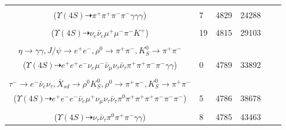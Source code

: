 \documentclass[landscape]{article}
\newcounter{rownumbers}
\newcommand\rn{\stepcounter{rownumbers}\arabic{rownumbers}}
\newcommand{\EOLP}{\\ \hline} %
\newcommand{\topoTags}[1]{#1} %
\begin{document}
\begin{longtable}{clcccc}
\rn & \makecell[l]{ $ 
\Upsilon(4S) \rightarrow B^{0} \bar{B}^{0} ,
B^{0} \rightarrow X_{sd} \gamma ,
\bar{B}^{0} \rightarrow \gamma \gamma ,
X_{sd} \rightarrow \rho^{0} K_{S}^{0} ,
\rho^{0} \rightarrow \pi^{+} \pi^{-} ,
K_{S}^{0} \rightarrow \pi^{+} \pi^{-} 
$ \\ ($
\Upsilon(4S) \dashrightarrow \pi^{+} \pi^{+} \pi^{-} \pi^{-} \gamma \gamma \gamma 
$) } & \topoTags{7 & }4829 & 24288 \EOLP

\rn & \makecell[l]{ $ 
\Upsilon(4S) \rightarrow B^{0} \bar{B}^{0} ,
B^{0} \rightarrow \nu_{e} \bar{\nu}_{e} K^{*} ,
\bar{B}^{0} \rightarrow \mu^{+} \mu^{-} ,
K^{*} \rightarrow \pi^{-} K^{+} 
$ \\ ($
\Upsilon(4S) \dashrightarrow \nu_{e} \bar{\nu}_{e} \mu^{+} \mu^{-} \pi^{-} K^{+} 
$) } & \topoTags{19 & }4815 & 29103 \EOLP

\rn & \makecell[l]{ $ 
\Upsilon(4S) \rightarrow B^{0} \bar{B}^{0} ,
B^{0} \rightarrow \tau^{+} \tau^{-} X_{sd} ,
\bar{B}^{0} \rightarrow \eta J/\psi ,
\tau^{+} \rightarrow e^{+} \nu_{e} \bar{\nu}_{\tau} ,
\tau^{-} \rightarrow \mu^{-} \bar{\nu}_{\mu} \nu_{\tau} ,
X_{sd} \rightarrow \rho^{0} K_{S}^{0} ,
$ \\ $
\eta \rightarrow \gamma \gamma ,
J/\psi \rightarrow e^{+} e^{-} ,
\rho^{0} \rightarrow \pi^{+} \pi^{-} ,
K_{S}^{0} \rightarrow \pi^{+} \pi^{-} 
$ \\ ($
\Upsilon(4S) \dashrightarrow e^{+} e^{+} e^{-} \nu_{e} \mu^{-} \bar{\nu}_{\mu} \nu_{\tau} \bar{\nu}_{\tau} \pi^{+} \pi^{+} \pi^{-} \pi^{-} \gamma \gamma 
$) } & \topoTags{0 & }4789 & 33892 \EOLP

\rn & \makecell[l]{ $ 
\Upsilon(4S) \rightarrow B^{0} \bar{B}^{0} ,
B^{0} \rightarrow \eta J/\psi ,
\bar{B}^{0} \rightarrow \tau^{+} \tau^{-} \bar{X}_{sd} ,
\eta \rightarrow \pi^{0} \pi^{+} \pi^{-} ,
J/\psi \rightarrow e^{+} e^{-} ,
\tau^{+} \rightarrow \mu^{+} \nu_{\mu} \bar{\nu}_{\tau} ,
$ \\ $
\tau^{-} \rightarrow e^{-} \bar{\nu}_{e} \nu_{\tau} ,
\bar{X}_{sd} \rightarrow \rho^{0} K_{S}^{0} ,
\rho^{0} \rightarrow \pi^{+} \pi^{-} ,
K_{S}^{0} \rightarrow \pi^{+} \pi^{-} 
$ \\ ($
\Upsilon(4S) \dashrightarrow e^{+} e^{-} e^{-} \bar{\nu}_{e} \mu^{+} \nu_{\mu} \nu_{\tau} \bar{\nu}_{\tau} \pi^{0} \pi^{+} \pi^{+} \pi^{+} \pi^{-} \pi^{-} \pi^{-} 
$) } & \topoTags{5 & }4786 & 38678 \EOLP

\rn & \makecell[l]{ $ 
\Upsilon(4S) \rightarrow B^{0} \bar{B}^{0} ,
B^{0} \rightarrow \nu_{\tau} \bar{\nu}_{\tau} \gamma ,
\bar{B}^{0} \rightarrow \bar{K}^{*} \gamma ,
\bar{K}^{*} \rightarrow \pi^{0} K_{S}^{0} ,
K_{S}^{0} \rightarrow \pi^{+} \pi^{-} 
$ \\ ($
\Upsilon(4S) \dashrightarrow \nu_{\tau} \bar{\nu}_{\tau} \pi^{0} \pi^{+} \pi^{-} \gamma \gamma 
$) } & \topoTags{8 & }4785 & 43463 \EOLP


\end{longtable}
\end{document}
